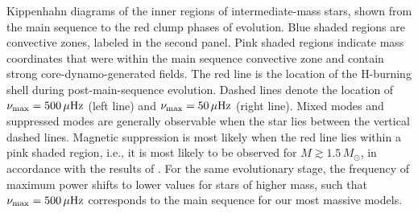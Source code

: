\label{fig:DipoleHist}
Kippenhahn diagrams of the inner regions of intermediate-mass stars, shown from the main sequence to the red clump phases of evolution. Blue shaded regions are convective zones, labeled in the second panel. Pink shaded regions indicate mass coordinates that were within the main sequence convective zone and contain strong core-dynamo-generated fields. The red line is the location of the H-burning shell during post-main-sequence evolution. Dashed lines denote the location of $\nu_{\rm max} = 500 \, \mu{\rm Hz}$ (left line) and $\nu_{\rm max} = 50 \, \mu{\rm Hz}$ (right line). Mixed modes and suppressed modes are generally observable when the star lies between the vertical dashed lines. Magnetic suppression is most likely when the red line lies within a pink shaded region, i.e., it is most likely to be observed for $M \gtrsim 1.5 \, M_\odot$, in accordance with the results of \cite{Stello_2016}. For the same evolutionary stage, the frequency of maximum power shifts to lower values for stars of higher mass, such that $\nu_{\rm max} = 500 \, \mu{\rm Hz}$ corresponds to the main sequence for our most massive models.